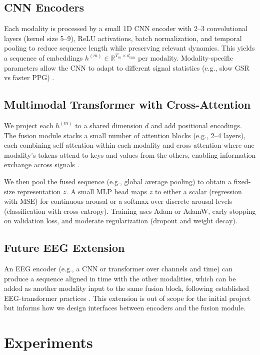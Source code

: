 \documentclass[conference]{IEEEtran}
\begin{document}
\subsection{CNN Encoders}
Each modality is processed by a small 1D CNN encoder with 2--3 convolutional layers (kernel size 5--9), ReLU activations, batch normalization, and temporal pooling to reduce sequence length while preserving relevant dynamics. This yields a sequence of embeddings $h^{(m)} \in \mathbb{R}^{T_m \times d_{\mathrm{cnn}}}$ per modality. Modality-specific parameters allow the CNN to adapt to different signal statistics (e.g., slow GSR vs faster PPG) \cite{kacimi_comprehensive_2025}.

\subsection{Multimodal Transformer with Cross-Attention}
We project each $h^{(m)}$ to a shared dimension $d$ and add positional encodings. The fusion module stacks a small number of attention blocks (e.g., 2--4 layers), each combining self-attention within each modality and cross-attention where one modality's tokens attend to keys and values from the others, enabling information exchange across signals \cite{ahire_maven_2025,ahire_maven_nodate}.

We then pool the fused sequence (e.g., global average pooling) to obtain a fixed-size representation $z$. A small MLP head maps $z$ to either a scalar (regression with MSE) for continuous arousal or a softmax over discrete arousal levels (classification with cross-entropy). Training uses Adam or AdamW, early stopping on validation loss, and moderate regularization (dropout and weight decay).

\subsection{Future EEG Extension}
An EEG encoder (e.g., a CNN or transformer over channels and time) can produce a sequence aligned in time with the other modalities, which can be added as another modality input to the same fusion block, following established EEG-transformer practices \cite{li_spatial_2025,cheng_eeg-based_2024,chen_eeg-based_2024}. This extension is out of scope for the initial project but informs how we design interfaces between encoders and the fusion module.

\section{Experiments}
\end{document}
